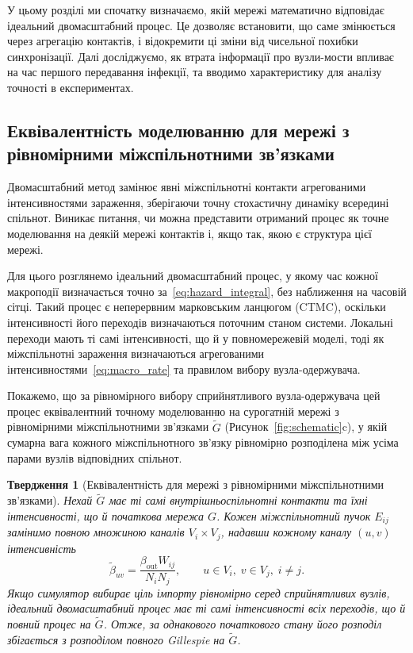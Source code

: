 \documentclass[a4paper,fleqn]{cas-sc}
\newtheorem{proposition}{Твердження}
\begin{document}
У цьому розділі ми спочатку визначаємо, якій мережі математично відповідає ідеальний двомасштабний процес. Це дозволяє встановити, що саме змінюється через агрегацію контактів, і відокремити ці зміни від чисельної похибки синхронізації. Далі досліджуємо, як втрата інформації про вузли-мости впливає на час першого передавання інфекції, та вводимо характеристику для аналізу точності в експериментах.



\subsection{Еквівалентність моделюванню для мережі з рівномірними міжспільнотними зв’язками}
\label{sec:surrogate}

Двомасштабний метод замінює явні міжспільнотні контакти агрегованими інтенсивностями зараження, зберігаючи точну стохастичну динаміку всередині спільнот. Виникає питання, чи можна представити отриманий процес як точне моделювання на деякій мережі контактів і, якщо так, якою є структура цієї мережі.

Для цього розглянемо ідеальний двомасштабний процес, у якому час кожної макроподії визначається точно за~\eqref{eq:hazard_integral}, без наближення на часовій сітці. Такий процес є неперервним марковським ланцюгом (CTMC), оскільки інтенсивності його переходів визначаються поточним станом системи. Локальні переходи мають ті самі інтенсивності, що й у повномережевій моделі, тоді як міжспільнотні зараження визначаються агрегованими інтенсивностями~\eqref{eq:macro_rate} та правилом вибору вузла-одержувача.

Покажемо, що за рівномірного вибору сприйнятливого вузла-одержувача цей процес еквівалентний точному моделюванню на сурогатній мережі з рівномірними міжспільнотними зв'язками $\tilde G$ (Рисунок~\ref{fig:schematic}c), у якій сумарна вага кожного міжспільнотного зв'язку рівномірно розподілена між усіма парами вузлів відповідних спільнот.

\begin{proposition}[Еквівалентність для мережі з рівномірними міжспільнотними зв’язками]
\label{prop:surrogate}
Нехай $\tilde G$ має ті самі внутрішньоспільнотні контакти та їхні інтенсивності, що й початкова мережа $G$. Кожен міжспільнотний пучок $E_{ij}$ замінимо повною множиною каналів $V_i\times V_j$, надавши кожному каналу $(u,v)$ інтенсивність
\[
\tilde\beta_{uv}
=
\frac{\beta_{\mathrm{out}}W_{ij}}{N_iN_j},
\qquad u\in V_i,\;v\in V_j,\;i\neq j.
\]
Якщо симулятор вибирає ціль імпорту рівномірно серед сприйнятливих вузлів, ідеальний двомасштабний процес має ті самі інтенсивності всіх переходів, що й повний процес на $\tilde G$. Отже, за однакового початкового стану його розподіл збігається з розподілом повного Gillespie на $\tilde G$.
\end{proposition}
\end{document}

